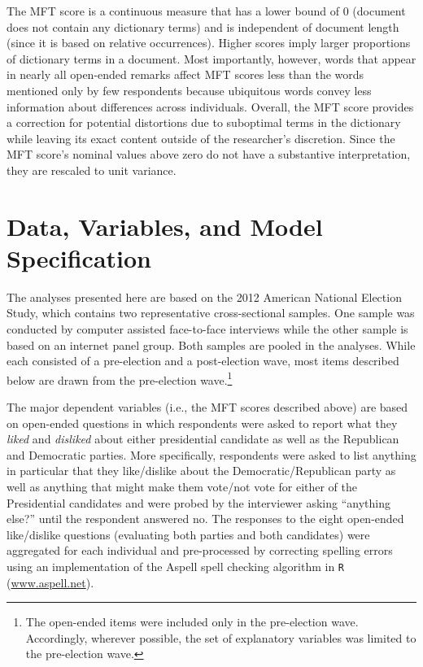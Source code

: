 \documentclass[12pt]{article}
\begin{document}
The MFT score is a continuous measure that has a lower bound of 0 (document does not contain any dictionary terms) and is independent of document length (since it is based on relative occurrences). Higher scores imply larger proportions of dictionary terms in a document. Most importantly, however, words that appear in nearly all open-ended remarks affect MFT scores less than the words mentioned only by few respondents because ubiquitous words convey less information about differences across individuals. Overall, the MFT score provides a correction for potential distortions due to suboptimal terms in the dictionary while leaving its exact content outside of the researcher's discretion. Since the MFT score's nominal values above zero do not have a substantive interpretation, they are rescaled to unit variance.



\section*{Data, Variables, and Model Specification}

The analyses presented here are based on the 2012 American National Election Study, which contains two representative cross-sectional samples. One sample was conducted by computer assisted face-to-face interviews while the other sample is based on an internet panel group. Both samples are pooled in the analyses. While each consisted of a pre-election and a post-election wave, most items described below are drawn from the pre-election wave.\footnote{The open-ended items were included only in the pre-election wave. Accordingly, wherever possible, the set of explanatory variables was limited to the pre-election wave.}

The major dependent variables (i.e., the MFT scores described above) are based on open-ended questions in which respondents were asked to report what they \textit{liked} and \textit{disliked} about either presidential candidate as well as the Republican and Democratic parties. More specifically, respondents were asked to list anything in particular that they like/dislike about the Democratic/Republican party as well as anything that might make them vote/not vote for either of the Presidential candidates and were probed by the interviewer asking ``anything else?'' until the respondent answered no. The responses to the eight open-ended like/dislike questions (evaluating both parties and both candidates) were aggregated for each individual and pre-processed by correcting spelling errors using an implementation of the Aspell spell checking algorithm in \texttt{R} (\url{www.aspell.net}).
\end{document}
